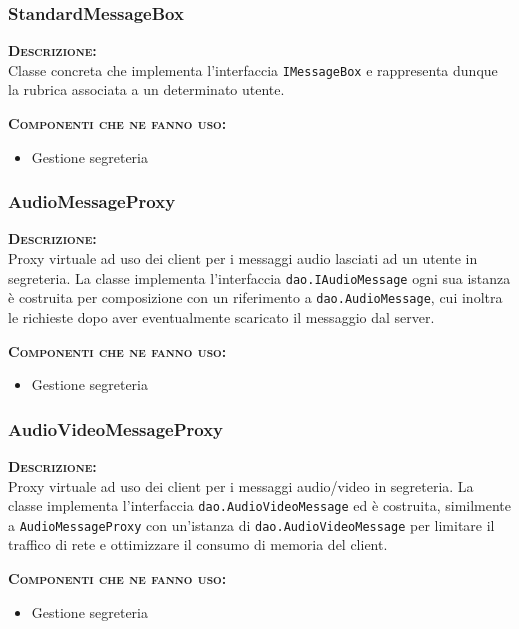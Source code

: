 \subsubsection{StandardMessageBox}
\begin{description}
	\item{\scshape\bfseries Descrizione:}\\
Classe concreta che implementa l'interfaccia \texttt{IMessageBox} e rappresenta dunque la rubrica associata a un determinato utente.
	\item{\scshape\bfseries Componenti che ne fanno uso:}
	\begin{itemize}[noitemsep,nolistsep]
	  \item Gestione segreteria
	\end{itemize}
\end{description}

\subsubsection{AudioMessageProxy}
\begin{description}
	\item{\scshape\bfseries Descrizione:}\\
Proxy virtuale ad uso dei client per i messaggi audio lasciati ad un utente in segreteria. La classe implementa l'interfaccia \texttt{dao.IAudioMessage} ogni sua istanza è costruita per composizione con un riferimento a  \texttt{dao.AudioMessage}, cui inoltra le richieste dopo aver eventualmente scaricato il messaggio dal server.
	\item{\scshape\bfseries Componenti che ne fanno uso:}
	\begin{itemize}[noitemsep,nolistsep]
	  \item Gestione segreteria
	\end{itemize}
\end{description}

\subsubsection{AudioVideoMessageProxy}
\begin{description}
	\item{\scshape\bfseries Descrizione:}\\
Proxy virtuale ad uso dei client per i messaggi audio/video in segreteria. La classe implementa l'interfaccia \texttt{dao.AudioVideoMessage} ed è costruita, similmente a \texttt{AudioMessageProxy} con un'istanza di \texttt{dao.AudioVideoMessage} per limitare il traffico di rete e ottimizzare il consumo di memoria del client.
	\item{\scshape\bfseries Componenti che ne fanno uso:}
	\begin{itemize}[noitemsep,nolistsep]
	  \item Gestione segreteria
	\end{itemize}
\end{description}


